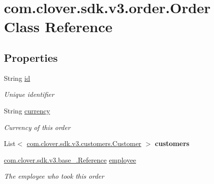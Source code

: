 \hypertarget{classcom_1_1clover_1_1sdk_1_1v3_1_1order_1_1_order}{}\section{com.\+clover.\+sdk.\+v3.\+order.\+Order Class Reference}
\label{classcom_1_1clover_1_1sdk_1_1v3_1_1order_1_1_order}
\subsection*{Properties}
\begin{DoxyCompactItemize}
\item 
String \hyperlink{classcom_1_1clover_1_1sdk_1_1v3_1_1order_1_1_order_a91a68a220b13c5286b119e2a7e2e0f78}{id}
\begin{DoxyCompactList}\small\item\em Unique identifier \end{DoxyCompactList}\item 
String \hyperlink{classcom_1_1clover_1_1sdk_1_1v3_1_1order_1_1_order_a00461b421fcfe792c0bf711d69bd36d1}{currency}
\begin{DoxyCompactList}\small\item\em Currency of this order \end{DoxyCompactList}\item 
\mbox{\label{classcom_1_1clover_1_1sdk_1_1v3_1_1order_1_1_order_ad48e02201419b42574730d7f89a2fcff}} 
List$<$ \hyperlink{classcom_1_1clover_1_1sdk_1_1v3_1_1customers_1_1_customer}{com.\+clover.\+sdk.\+v3.\+customers.\+Customer} $>$ {\bfseries customers}
\item 
\hyperlink{classcom_1_1clover_1_1sdk_1_1v3_1_1base___1_1_reference}{com.\+clover.\+sdk.\+v3.\+base\+\_\+.\+Reference} \hyperlink{classcom_1_1clover_1_1sdk_1_1v3_1_1order_1_1_order_a4beff41200c929358225a79e7429b8c1}{employee}
\begin{DoxyCompactList}\small\item\em The employee who took this order \end{DoxyCompactList}\item 

\end{DoxyCompactItemize}
